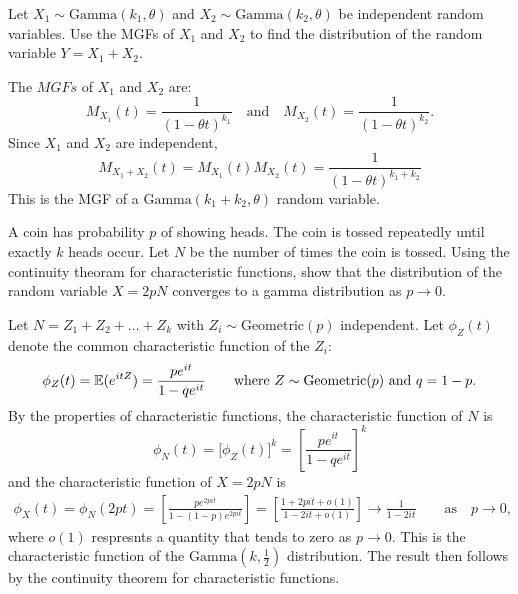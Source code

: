 \begin{exercise}
\begin{questions}
\question
Let $X_1\sim\text{Gamma}(k_1,\theta)$ and $X_2\sim\text{Gamma}(k_2,\theta)$ be independent random variables. Use the MGFs of $X_1$ and $X_2$ to find the distribution of the random variable $Y=X_1+X_2$.


\begin{answer}
The $MGFs$ of $X_1$ and $X_2$ are:
\[
M_{X_1}(t) = \frac{1}{(1-\theta t)^{k_1}}
\quad\text{and}\quad
M_{X_2}(t) = \frac{1}{(1-\theta t)^{k_2}}.
\]
Since $X_1$ and $X_2$ are independent, 
\[
M_{X_1+X_2}(t) 
=	M_{X_1}(t)M_{X_2}(t) 
= \frac{1}{(1-\theta t)^{k_1+k_2}}
\]
This is the MGF of a $\text{Gamma}(k_1+k_2,\theta)$ random variable.
\end{answer}

\question
A coin has probability $p$ of showing heads. The coin is tossed repeatedly until exactly $k$ heads occur. Let $N$ be the number of times the coin is tossed. Using the continuity theoram for characteristic functions, show that the distribution of the random variable $X=2pN$ converges to a gamma distribution as $p\to 0$.

\begin{answer}
Let $N=Z_1+Z_2+\ldots+Z_k$ with $Z_i\sim\text{Geometric}(p)$ independent. Let $\phi_Z(t)$ denote the common characteristic function of the $Z_i$:
\[
\phi_Z(t) = \mathbb{E}(e^{itZ}) = \frac{pe^{it}}{1-qe^{it}} \qquad\text{where $Z\sim\text{Geometric}(p)$ and $q=1-p$.}
\]
By the properties of characteristic functions, the characteristic function of $N$ is
\[
\phi_N(t) = \big[\phi_Z(t)\big]^k = \left[\frac{pe^{it}}{1-qe^{it}}\right]^k
\]
and the characteristic function of $X=2pN$ is
\begin{align*}
\phi_X(t) = \phi_N(2pt) 
	= \left[\frac{pe^{2pit}}{1-(1-p)e^{2pit}}\right] 
	= \left[\frac{1 + 2pit + o(1)}{1 - 2it + o(1)}\right]
	\rightarrow \frac{1}{1 - 2it} \qquad\text{as}\quad p\to 0,
\end{align*}	
where $o(1)$ respresnts a quantity that tends to zero as $p\to 0$. This is the characteristic function of the $\text{Gamma}(k,\frac{1}{2})$ distribution. The result then follows by the continuity theorem for characteristic functions.
\end{answer}



\end{questions}
\end{exercise}
